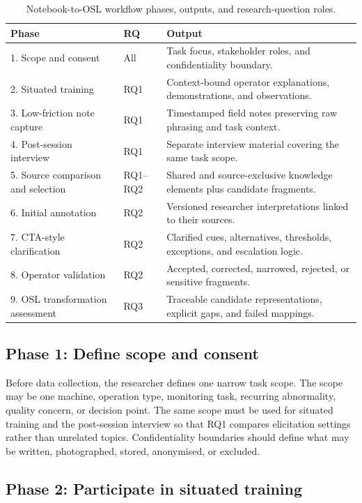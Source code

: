 \begin{table}[htbp]
\centering
\caption{Notebook-to-OSL workflow phases, outputs, and research-question roles.}
\label{tab:workflow}
\begin{tabularx}{\textwidth}{p{}p{}X}
\toprule
Phase & RQ & Output \\
\midrule
1. Scope and consent & All & Task focus, stakeholder roles, and confidentiality boundary. \\
2. Situated training & RQ1 & Context-bound operator explanations, demonstrations, and observations. \\
3. Low-friction note capture & RQ1 & Timestamped field notes preserving raw phrasing and task context. \\
4. Post-session interview & RQ1 & Separate interview material covering the same task scope. \\
5. Source comparison and selection & RQ1--RQ2 & Shared and source-exclusive knowledge elements plus candidate fragments. \\
6. Initial annotation & RQ2 & Versioned researcher interpretations linked to their sources. \\
7. CTA-style clarification & RQ2 & Clarified cues, alternatives, thresholds, exceptions, and escalation logic. \\
8. Operator validation & RQ2 & Accepted, corrected, narrowed, rejected, or sensitive fragments. \\
9. OSL transformation assessment & RQ3 & Traceable candidate representations, explicit gaps, and failed mappings. \\
\bottomrule
\end{tabularx}
\end{table}

\subsection{Phase 1: Define scope and consent}

Before data collection, the researcher defines one narrow task scope. The scope may be one machine, operation type, monitoring task, recurring abnormality, quality concern, or decision point. The same scope must be used for situated training and the post-session interview so that RQ1 compares elicitation settings rather than unrelated topics. Confidentiality boundaries should define what may be written, photographed, stored, anonymised, or excluded.

\subsection{Phase 2: Participate in situated training}

